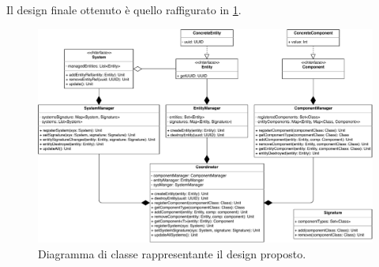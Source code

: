 Il design finale ottenuto è quello raffigurato in \ref{fig:ECS}.

\begin{figure}[H]
	\centering
	\includegraphics[width=0.99\columnwidth]{drawio/ECS/ECS.pdf}
	\caption{Diagramma di classe rappresentante il design proposto.}
	\label{fig:ECS}
\end{figure}

